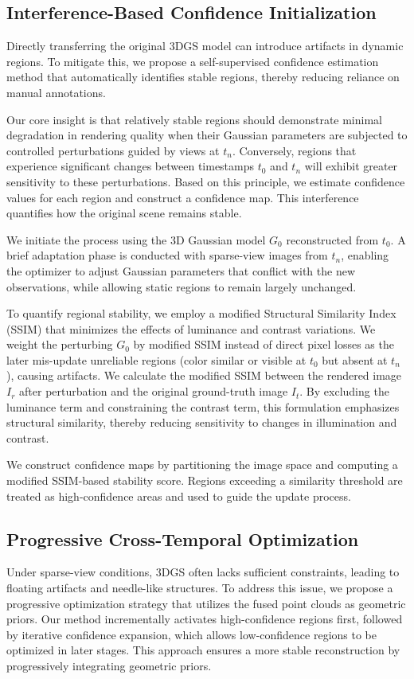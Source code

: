 \documentclass[letterpaper]{article} %
\begin{document}
\subsection{Interference-Based Confidence Initialization}
Directly transferring the original 3DGS model can introduce artifacts in dynamic regions. To mitigate this, we propose a self-supervised confidence estimation method that automatically identifies stable regions, thereby reducing reliance on manual annotations. 

Our core insight is that relatively stable regions should demonstrate minimal degradation in rendering quality when their Gaussian parameters are subjected to controlled perturbations guided by views at $t_n$. Conversely, regions that experience significant changes between timestamps \(t_0\) and \(t_n\) will exhibit greater sensitivity to these perturbations. Based on this principle, we estimate confidence values for each region and construct a confidence map. This interference quantifies how the original scene remains stable.

We initiate the process using the 3D Gaussian model \(G_0\) reconstructed from \(t_0\). 
A brief adaptation phase is conducted with sparse-view images from \(t_n\), enabling the optimizer to adjust Gaussian parameters that conflict with the new observations, while allowing static regions to remain largely unchanged.

To quantify regional stability, we employ a modified Structural Similarity Index (SSIM) \cite{wang2004ssim} that minimizes the effects of luminance and contrast variations. We weight the perturbing $G_0$ by modified SSIM instead of direct pixel losses as the later mis-update unreliable regions (color similar or visible at $t_0$ but absent at $t_n$), causing artifacts. We calculate the modified SSIM between the rendered image \(I_r\) after perturbation and the original ground-truth image \(I_t\).
By excluding the luminance term and constraining the contrast term, this formulation emphasizes structural similarity, thereby reducing sensitivity to changes in illumination and contrast.

We construct confidence maps by partitioning the image space and computing a modified SSIM-based stability score. Regions exceeding a similarity threshold are treated as high-confidence areas and used to guide the update process.

\subsection{Progressive Cross-Temporal Optimization}
Under sparse-view conditions, 3DGS often lacks sufficient constraints, leading to floating artifacts and needle-like structures. To address this issue, we propose a progressive optimization strategy that utilizes the fused point clouds as geometric priors. Our method incrementally activates high-confidence regions first, followed by iterative confidence expansion, which allows low-confidence regions to be optimized in later stages. This approach ensures a more stable reconstruction by progressively integrating geometric priors.
\end{document}
